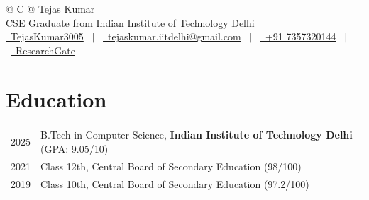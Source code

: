 \documentclass[letterpaper,10pt]{article}
\begin{document}
\pagestyle{empty}

\begin{tabularx}{\linewidth}{@{} C @{}}
\huge{Tejas Kumar} \\[1pt]
\small CSE Graduate from Indian Institute of Technology Delhi \\[2pt]
\small
\href{https://github.com/TejasKumar3005}{\raisebox{-0.05\height}\faGithub\ TejasKumar3005} \ $|$ \
\href{mailto:tejaskumar.iitdelhi@gmail.com}{\raisebox{-0.05\height}\faEnvelope\ tejaskumar.iitdelhi@gmail.com} \ $|$ \
\href{tel:+917357320144}{\raisebox{-0.05\height}\faMobile\ +91 7357320144} \ $|$ \
\href{https://www.researchgate.net/profile/Tejas-Kumar-10}{\raisebox{-0.05\height}\aiResearchGate\ ResearchGate} \\
\end{tabularx}

\section{Education}
\begin{tabularx}{\linewidth}{@{}l X@{}}
2025 & B.Tech in Computer Science, \textbf{Indian Institute of Technology Delhi} \hfill (GPA: 9.05/10) \\
2021 & Class 12th, Central Board of Secondary Education \hfill (98/100) \\
2019 & Class 10th, Central Board of Secondary Education \hfill (97.2/100) \\
\end{tabularx}

\end{document}
